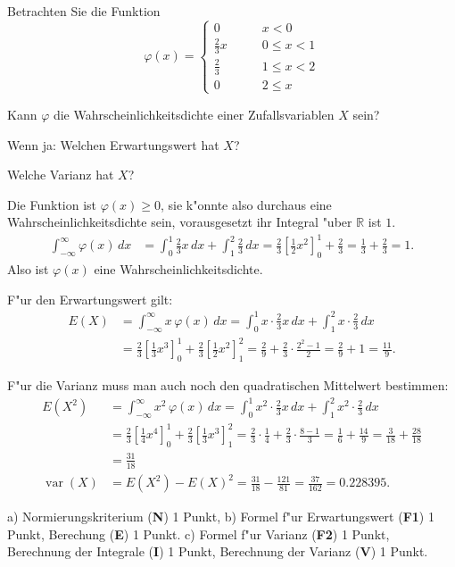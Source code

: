 Betrachten Sie die Funktion
\[
\varphi(x)=\begin{cases}
0&\qquad x < 0\\
\frac23x&\qquad 0\le x< 1\\
\frac23&\qquad 1\le x< 2\\
0&\qquad 2\le x
\end{cases}
\]
\begin{teilaufgaben}
\item Kann $\varphi$ die Wahrscheinlichkeitsdichte einer Zufallsvariablen
$X$ sein?
\item Wenn ja: Welchen Erwartungswert hat $X$?
\item Welche Varianz hat $X$?
\end{teilaufgaben}

\begin{loesung}
\begin{teilaufgaben}
\item Die Funktion ist $\varphi(x)\ge 0$, sie k"onnte also durchaus
eine Wahrscheinlichkeitsdichte sein, vorausgesetzt ihr Integral "uber
$\mathbb R$ ist $1$.
\begin{align*}
\int_{-\infty}^{\infty}\varphi(x)\,dx
&=
\int_0^1\frac23x\,dx
+\int_1^2\frac23\,dx
=\frac23\left[
\frac12x^2
\right]_0^1
+\frac23
=\frac13+\frac23=1.
\end{align*}
Also ist $\varphi(x)$ eine Wahrscheinlichkeitsdichte.
\item F"ur den Erwartungswert gilt:
\begin{align*}
E(X)
&=\int_{-\infty}^{\infty}x\,\varphi(x)\,dx
=
\int_0^1 x\cdot \frac23x\,dx + \int_1^2x\cdot \frac23\,dx
\\
&=
\frac23\left[ \frac13x^3 \right]_0^1 + \frac23\left[ \frac12x^2 \right]_1^2
=\frac29 + \frac23\cdot\frac{2^2-1}2
=\frac29 + 1=\frac{11}9.
\end{align*}
\item F"ur die Varianz muss man auch noch den quadratischen Mittelwert
bestimmen:
\begin{align*}
E(X^2)
&=
\int_{-\infty}^{\infty}x^2\,\varphi(x)\,dx
=
\int_0^1 x^2\cdot \frac23x\,dx + \int_1^2x^2\cdot \frac23\,dx
\\
&=
\frac23 \left[ \frac14 x^4 \right]_0^1
+\frac23 \left[ \frac13 x^3 \right]_1^2
=\frac23\cdot\frac14+\frac23\cdot\frac{8-1}3
=\frac16+\frac{14}9=\frac3{18}+\frac{28}{18}
\\
&=\frac{31}{18}
\\
\operatorname{var}(X)
&=
E(X^2)-E(X)^2
=\frac{31}{18}-\frac{121}{81}
=\frac{37}{162}
=0.228395.
\end{align*}
\end{teilaufgaben}
\end{loesung}

\begin{bewertung}
a) Normierungskriterium ({\bf N}) 1 Punkt,
b) Formel f"ur Erwartungswert ({\bf F1}) 1 Punkt, Berechung ({\bf E}) 1 Punkt.
c) Formel f"ur Varianz ({\bf F2}) 1 Punkt, Berechnung der Integrale ({\bf I})
1 Punkt, Berechnung der Varianz ({\bf V}) 1 Punkt.
\end{bewertung}
